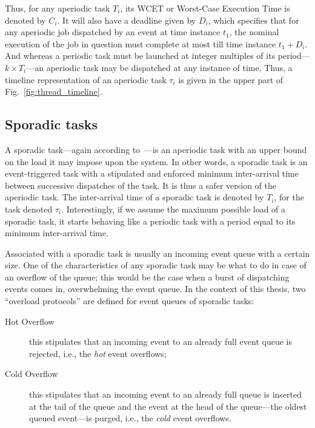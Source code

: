 Thus, for any aperiodic task $T_i$, its WCET or Worst-Case Execution
Time is denoted by $C_i$. It will also have a deadline given by $D_i$,
which specifies that for any aperiodic job dispatched by an event at
time instance $t_1$, the nominal execution of the job in question must
complete at most till time instance $t_1 + D_i$. And whereas a
periodic task must be launched at integer multiples of its
period---$k\times T_i$---an aperiodic task may be dispatched at any
instance of time. Thus, a timeline representation of an aperiodic task
$\tau_i$ is given in the upper part of Fig.~\ref{fig:thread_timeline}.

\subsection{Sporadic tasks}
A sporadic task---again according to~\cite{sha@rts04}---is an
aperiodic task with an upper bound on the load it may impose upon the
system. In other words, a sporadic task is an event-triggered task
with a stipulated and enforced minimum inter-arrival time between
successive dispatches of the task. It is thus a safer version of the
aperiodic task. The inter-arrival time of a sporadic task is denoted
by $T_i$, for the task denoted $\tau_i$. Interestingly, if we assume
the maximum possible load of a sporadic task, it starts behaving like
a periodic task with a period equal to its minimum inter-arrival time.

Associated with a sporadic task is usually an incoming event queue
with a certain size. One of the characteristics of any sporadic task
may be what to do in case of an overflow of the queue; this would be
the case when a burst of dispatching events comes in, overwhelming the
event queue. In the context of this thesis, two ``overload protocols''
are defined for event queues of sporadic tasks:

\begin{description}
\item[Hot Overflow]{this stipulates that an incoming event to an
  already full event queue is rejected, i.e., the \emph{hot} event
  overflows;}
\item[Cold Overflow]{this stipulates that an incoming event to an
  already full queue is inserted at the tail of the queue and the
  event at the head of the queue---the oldest queued event---is
  purged, i.e., the \emph{cold} event overflows.}
\end{description}

